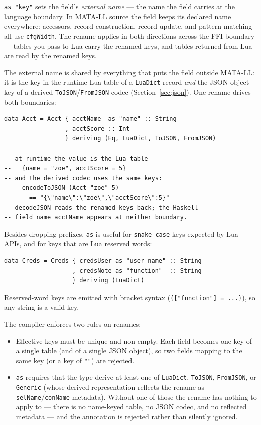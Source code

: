 \documentclass[11pt,a4paper]{article}
\begin{document}
\texttt{as "key"} sets the field's \emph{external name} --- the name
the field carries at the language boundary.  In MATA-LL source the
field keeps its declared name everywhere: accessors, record
construction, record update, and pattern matching all use
\texttt{cfgWidth}.  The rename applies in both directions across the
FFI boundary --- tables you pass to Lua carry the renamed keys, and
tables returned from Lua are read by the renamed keys.

The external name is shared by everything that puts the field outside
MATA-LL: it is the key in the runtime Lua table of a \texttt{LuaDict}
record \emph{and} the JSON object key of a derived
\texttt{ToJSON}/\texttt{FromJSON} codec (Section~\ref{sec:json}).  One
rename drives both boundaries:

\begin{lstlisting}
data Acct = Acct { acctName  as "name" :: String
                 , acctScore :: Int
                 } deriving (Eq, LuaDict, ToJSON, FromJSON)

-- at runtime the value is the Lua table
--   {name = "zoe", acctScore = 5}
-- and the derived codec uses the same keys:
--   encodeToJSON (Acct "zoe" 5)
--     == "{\"name\":\"zoe\",\"acctScore\":5}"
-- decodeJSON reads the renamed keys back; the Haskell
-- field name acctName appears at neither boundary.
\end{lstlisting}

Besides dropping prefixes, \texttt{as} is useful for
\texttt{snake\_case} keys expected by Lua APIs, and for keys that are
Lua reserved words:

\begin{lstlisting}
data Creds = Creds { credsUser as "user_name" :: String
                   , credsNote as "function"  :: String
                   } deriving (LuaDict)
\end{lstlisting}

Reserved-word keys are emitted with bracket syntax
(\texttt{\{["function"] = ...\}}), so any string is a valid key.

The compiler enforces two rules on renames:

\begin{itemize}[nosep]
  \item Effective keys must be unique and non-empty.  Each field
        becomes one key of a single table (and of a single JSON
        object), so two fields mapping to the same key (or a key of
        \texttt{""}) are rejected.
  \item \texttt{as} requires that the type derive at least one of
        \texttt{LuaDict}, \texttt{ToJSON}, \texttt{FromJSON}, or
        \texttt{Generic} (whose derived representation reflects the
        rename as \texttt{selName}/\texttt{conName} metadata).
        Without one of those the rename has nothing to apply to ---
        there is no name-keyed table, no JSON codec, and no
        reflected metadata --- and the annotation is rejected
        rather than silently ignored.
\end{itemize}
\end{document}
